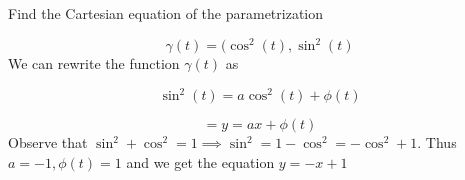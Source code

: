 \begin{problem}
		Find the Cartesian equation of the parametrization

\[
\gamma(t) = (\cos^{2}(t), \sin^{2}(t)
\]
		We can rewrite the function \(\gamma(t)\) as

\[
\sin^{2}(t) = a\cos^{2}(t) + \phi(t)
\]

\[
= y = ax + \phi(t)
\]
		Observe that \(\sin^{2} + \cos^{2} = 1 \implies \sin^{2} = 1 - \cos^{2} = -\cos^{2} + 1\). Thus \(a = -1, \phi(t) = 1\) and we get the equation \(y = -x + 1\)
    \end{problem}
